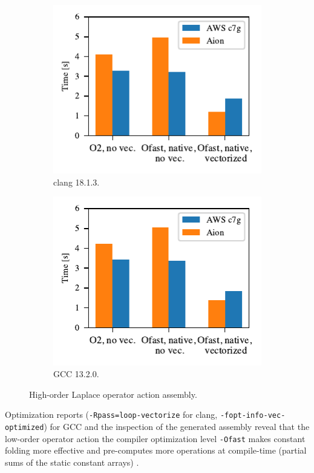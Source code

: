 \begin{figure}
    \begin{subfigure}{.5\textwidth}
        \centering
        \includegraphics{chapters/chp1/graphics/kernel_plots/local_operator_clang_deg8.pdf}
        \caption{clang 18.1.3.}
        \label{fig:local-clang-deg8}
    \end{subfigure}%
    \begin{subfigure}{.5\textwidth}
        \centering
        \includegraphics{chapters/chp1/graphics/kernel_plots/local_operator_gcc_deg8.pdf}
        \caption{GCC 13.2.0.}
        \label{fig:local-gcc-deg8}
    \end{subfigure}
    \caption{High-order Laplace operator action assembly.}
    \label{fig:local-deg8}
\end{figure}

Optimization reports (\texttt{-Rpass=loop-vectorize} for clang,
\texttt{-fopt-info-vec-optimized}) for GCC and the inspection of the generated
assembly reveal that the low-order operator action the compiler optimization
level \lstinline{-Ofast} makes constant folding more effective and pre-computes
more operations at compile-time (partial sums of the static constant arrays)
\citep{GodboltArmClangDeg1}.

